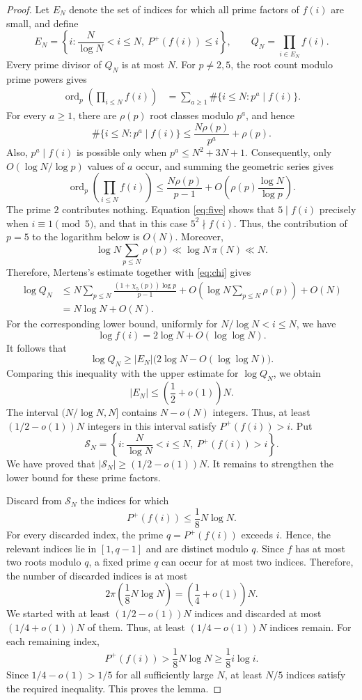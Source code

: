 \documentclass[11pt]{amsart}
\theoremstyle{definition}
\theoremstyle{remark}
\begin{document}
\begin{proof}
Let $E_N$ denote the set of indices for which all prime factors of $f(i)$
are small, and define
\[
E_N=\left\{i:\frac{N}{\log N}<i\leq N,\ P^+(f(i))\leq i\right\},
\qquad
Q_N=\prod_{i\in E_N}f(i).
\]
Every prime divisor of $Q_N$ is at most $N$.  For $p\neq2,5$, the root count
modulo prime powers gives
\begin{align*}
\operatorname{ord}_p\left(\prod_{i\leq N}f(i)\right)
&=\sum_{a\geq1}\#\{i\leq N:p^a\mid f(i)\}.
\end{align*}
For every $a\geq1$, there are $\rho(p)$ root classes modulo $p^a$, and hence
\[
\#\{i\leq N:p^a\mid f(i)\}
\leq \frac{N\rho(p)}{p^a}+\rho(p).
\]
Also, $p^a\mid f(i)$ is possible only when $p^a\leq N^2+3N+1$.
Consequently, only $O(\log N/\log p)$ values of $a$ occur, and summing the
geometric series gives
\[
\operatorname{ord}_p\left(\prod_{i\leq N}f(i)\right)
\leq
\frac{N\rho(p)}{p-1}
+O\left(\rho(p)\frac{\log N}{\log p}\right).
\]
The prime $2$ contributes nothing.  Equation \eqref{eq:five} shows that
$5\mid f(i)$ precisely when $i\equiv1\pmod5$, and that in this case
$5^2\nmid f(i)$.  Thus, the contribution of $p=5$ to the logarithm below is
$O(N)$.  Moreover,
\[
\log N\sum_{p\leq N}\rho(p)\ll \log N\,\pi(N)\ll N.
\]
Therefore, Mertens's estimate together with \eqref{eq:chi} gives
\begin{align*}
\log Q_N
&\leq
N\sum_{p\leq N}\frac{(1+\chi_5(p))\log p}{p-1}
+O\left(\log N\sum_{p\leq N}\rho(p)\right)+O(N)\\
&=N\log N+O(N).
\end{align*}
For the corresponding lower bound, uniformly for
$N/\log N<i\leq N$, we have
\[
\log f(i)=2\log N+O(\log\log N).
\]
It follows that
\[
\log Q_N
\geq |E_N|\bigl(2\log N-O(\log\log N)\bigr).
\]
Comparing this inequality with the upper estimate for $\log Q_N$, we obtain
\[
|E_N|\leq\left(\frac12+o(1)\right)N.
\]
The interval $(N/\log N,N]$ contains $N-o(N)$ integers.  Thus, at least
$(1/2-o(1))N$ integers in this interval satisfy $P^+(f(i))>i$.  Put
\[
\mathcal S_N=
\left\{i:\frac{N}{\log N}<i\leq N,\ P^+(f(i))>i\right\}.
\]
We have proved that $|\mathcal S_N|\geq(1/2-o(1))N$.  It remains to
strengthen the lower bound for these prime factors.

Discard from $\mathcal S_N$ the indices for which
\[
P^+(f(i))\leq\frac18N\log N.
\]
For every discarded index, the prime $q=P^+(f(i))$ exceeds $i$.  Hence, the
relevant indices lie in $[1,q-1]$ and are distinct modulo $q$.  Since $f$
has at most two roots modulo $q$, a fixed prime $q$ can occur for at most two
indices.  Therefore,
the number of discarded indices is at most
\[
2\pi\left(\frac18N\log N\right)
=\left(\frac14+o(1)\right)N.
\]
We started with at least $(1/2-o(1))N$ indices and discarded at most
$(1/4+o(1))N$ of them.  Thus, at least $(1/4-o(1))N$ indices remain.  For
each remaining index,
\[
P^+(f(i))>\frac18N\log N\geq\frac18i\log i.
\]
Since $1/4-o(1)>1/5$ for all sufficiently large $N$, at least $N/5$ indices
satisfy the required inequality.  This proves the lemma.
\end{proof}
\end{document}
